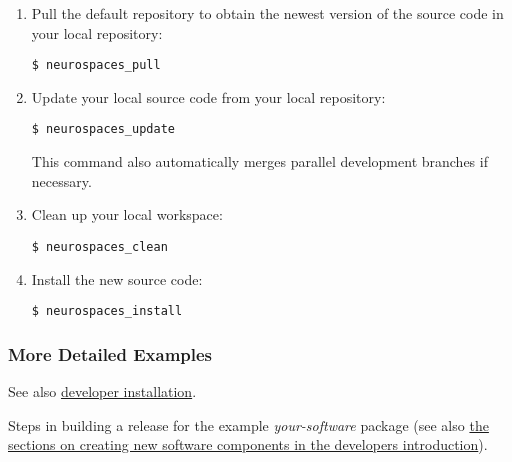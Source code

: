 \documentclass[12pt]{article}
\begin{document}
\begin{enumerate}
\item Pull the default repository to obtain the newest version of the
  source code in your local repository:
\begin{verbatim}
$ neurospaces_pull
\end{verbatim}

\item Update your local source code from your local repository:
\begin{verbatim}
$ neurospaces_update
\end{verbatim}
  This command also automatically merges parallel development branches
  if necessary.

\item Clean up your local workspace:
\begin{verbatim}
$ neurospaces_clean
\end{verbatim}

\item Install the new source code:
\begin{verbatim}
$ neurospaces_install
\end{verbatim}

\end{enumerate}


\subsubsection*{More Detailed Examples}

See also
\href{../installation-developer/installation-developer.tex}{developer
  installation}.

Steps in building a release for the example {\it your-software}
package (see also \href{../developers-intro/developers-intro.tex}{the
  sections on creating new software components in the developers
  introduction}).
\end{document}
